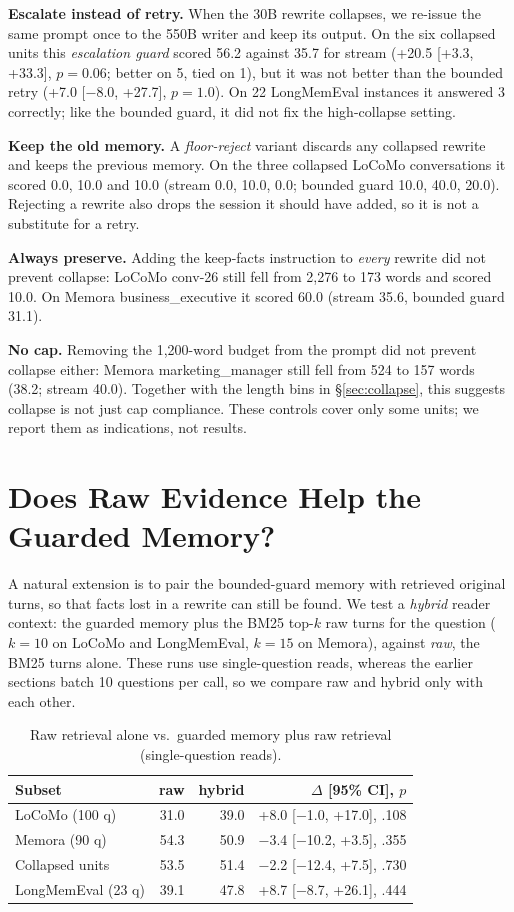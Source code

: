 \documentclass[11pt]{article}
\begin{document}
\textbf{Escalate instead of retry.} When the 30B rewrite collapses, we re-issue the same prompt once to the 550B writer and keep its output. On the six collapsed units this \emph{escalation guard} scored 56.2 against 35.7 for stream (+20.5 [+3.3, +33.3], $p{=}0.06$; better on 5, tied on 1), but it was not better than the bounded retry (+7.0 [$-$8.0, +27.7], $p{=}1.0$). On 22 LongMemEval instances it answered 3 correctly; like the bounded guard, it did not fix the high-collapse setting.

\textbf{Keep the old memory.} A \emph{floor-reject} variant discards any collapsed rewrite and keeps the previous memory. On the three collapsed LoCoMo conversations it scored 0.0, 10.0 and 10.0 (stream 0.0, 10.0, 0.0; bounded guard 10.0, 40.0, 20.0). Rejecting a rewrite also drops the session it should have added, so it is not a substitute for a retry.

\textbf{Always preserve.} Adding the keep-facts instruction to \emph{every} rewrite did not prevent collapse: LoCoMo conv-26 still fell from 2,276 to 173 words and scored 10.0. On Memora business\_executive it scored 60.0 (stream 35.6, bounded guard 31.1).

\textbf{No cap.} Removing the 1,200-word budget from the prompt did not prevent collapse either: Memora marketing\_manager still fell from 524 to 157 words (38.2; stream 40.0). Together with the length bins in \S\ref{sec:collapse}, this suggests collapse is not just cap compliance. These controls cover only some units; we report them as indications, not results.

\section{Does Raw Evidence Help the Guarded Memory?}\label{sec:hybrid}
A natural extension is to pair the bounded-guard memory with retrieved original turns, so that facts lost in a rewrite can still be found. We test a \emph{hybrid} reader context: the guarded memory plus the BM25 top-$k$ raw turns for the question ($k{=}10$ on LoCoMo and LongMemEval, $k{=}15$ on Memora), against \emph{raw}, the BM25 turns alone. These runs use single-question reads, whereas the earlier sections batch 10 questions per call, so we compare raw and hybrid only with each other.

\begin{table}[t]
\centering\small
\setlength{\tabcolsep}{1.5pt}
\begin{tabular}{lrrr}
\toprule
Subset & raw & hybrid & $\Delta$ [95\% CI], $p$ \\
\midrule
LoCoMo (100 q) & 31.0 & 39.0 & +8.0 [$-$1.0, +17.0], .108 \\
Memora (90 q) & 54.3 & 50.9 & $-$3.4 [$-$10.2, +3.5], .355 \\
Collapsed units & 53.5 & 51.4 & $-$2.2 [$-$12.4, +7.5], .730 \\
LongMemEval (23 q) & 39.1 & 47.8 & +8.7 [$-$8.7, +26.1], .444 \\
\bottomrule
\end{tabular}
\caption{Raw retrieval alone vs.\ guarded memory plus raw retrieval (single-question reads).}
\label{tab:hybrid}
\end{table}
\end{document}

